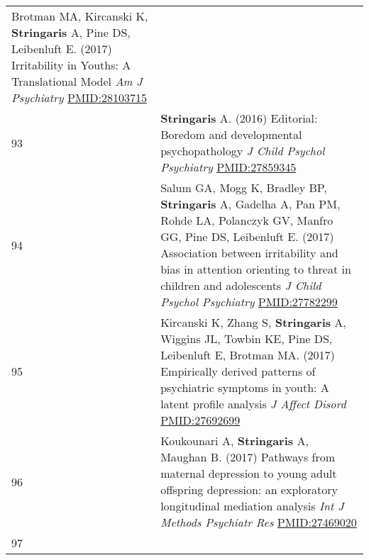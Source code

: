 \documentclass[
]{article}
\begin{document}
\begin{longtable}[]{@{}ll@{}}
\begin{minipage}[t]{0.94\columnwidth}
Brotman MA, Kircanski K, \textbf{Stringaris} A, Pine DS, Leibenluft E.
(2017) Irritability in Youths: A Translational Model \emph{Am J
Psychiatry} \url{PMID:28103715}\strut
\end{minipage}\tabularnewline
\begin{minipage}[t]{0.01\columnwidth}\raggedright
93\strut
\end{minipage} & \begin{minipage}[t]{0.94\columnwidth}\raggedright
\textbf{Stringaris} A. (2016) Editorial: Boredom and developmental
psychopathology \emph{J Child Psychol Psychiatry}
\url{PMID:27859345}\strut
\end{minipage}\tabularnewline
\begin{minipage}[t]{0.01\columnwidth}\raggedright
94\strut
\end{minipage} & \begin{minipage}[t]{0.94\columnwidth}\raggedright
Salum GA, Mogg K, Bradley BP, \textbf{Stringaris} A, Gadelha A, Pan PM,
Rohde LA, Polanczyk GV, Manfro GG, Pine DS, Leibenluft E. (2017)
Association between irritability and bias in attention orienting to
threat in children and adolescents \emph{J Child Psychol Psychiatry}
\url{PMID:27782299}\strut
\end{minipage}\tabularnewline
\begin{minipage}[t]{0.01\columnwidth}\raggedright
95\strut
\end{minipage} & \begin{minipage}[t]{0.94\columnwidth}\raggedright
Kircanski K, Zhang S, \textbf{Stringaris} A, Wiggins JL, Towbin KE, Pine
DS, Leibenluft E, Brotman MA. (2017) Empirically derived patterns of
psychiatric symptoms in youth: A latent profile analysis \emph{J Affect
Disord} \url{PMID:27692699}\strut
\end{minipage}\tabularnewline
\begin{minipage}[t]{0.01\columnwidth}\raggedright
96\strut
\end{minipage} & \begin{minipage}[t]{0.94\columnwidth}\raggedright
Koukounari A, \textbf{Stringaris} A, Maughan B. (2017) Pathways from
maternal depression to young adult offspring depression: an exploratory
longitudinal mediation analysis \emph{Int J Methods Psychiatr Res}
\url{PMID:27469020}\strut
\end{minipage}\tabularnewline
\begin{minipage}[t]{0.01\columnwidth}\raggedright
97\strut
\end{minipage} & \begin{minipage}[t]{0.94\columnwidth}\raggedright

\end{minipage}
\end{longtable}
\end{document}
